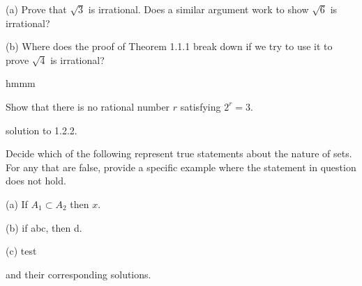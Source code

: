 \documentclass[../analysis_sols.tex]{subfiles}
\begin{document}
\begin{exercise}
    \indent
    (a) Prove that \( \sqrt{3} \) is irrational. Does a similar argument work to show \( \sqrt{6} \) is irrational?

    (b) Where does the proof of Theorem 1.1.1\footnotemark{} break down if we try to use it to prove \( \sqrt{4} \) is irrational?
\end{exercise}
 
\begin{solution}
    hmmm
\end{solution}


\begin{exercise}
    Show that there is no rational number \( r \) satisfying \( 2^{r} = 3 \).
\end{exercise}

\begin{solution}
    solution to 1.2.2.
\end{solution}




\begin{exercise}
    Decide which of the following represent true statements about the nature of sets. For any that are false, provide a specific example where the statement in question does not hold.

    (a) If \( A_{1} \subset A_{2} \) then \( x \).

    (b) if abc, then d.     

    (c) test
\end{exercise}

\begin{solution}
    and their corresponding solutions.
\end{solution}
\end{document}
